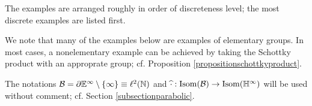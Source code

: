 
The examples are arranged roughly in order of discreteness level; the most discrete examples are listed first.

We note that many of the examples below are examples of elementary groups. In most cases, a nonelementary example can be achieved by taking the Schottky product with an approprate group; cf. Proposition \ref{propositionschottkyproduct}.

The notations $\BB = \del\E^\infty\butnot\{\infty\}\equiv\ell^2(\N)$ and $\what\cdot:\Isom(\BB)\to \Isom(\H^\infty)$ will be used without comment; cf. Section \ref{subsectionparabolic}.

